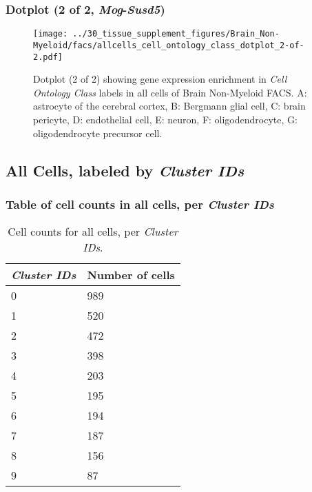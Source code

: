 \clearpage

\subsubsection{Dotplot (2 of 2, \emph{Mog}-\emph{Susd5})}
\begin{figure}[h]
\centering
\texttt{[image: ../30\_tissue\_supplement\_figures/Brain\_Non-Myeloid/facs/allcells\_cell\_ontology\_class\_dotplot\_2-of-2.pdf]}

\caption{ Dotplot (2 of 2)  showing gene expression enrichment in \emph{Cell Ontology Class} labels in all cells of Brain Non-Myeloid FACS. A: astrocyte of the cerebral cortex, B: Bergmann glial cell, C: brain pericyte, D: endothelial cell, E: neuron, F: oligodendrocyte, G: oligodendrocyte precursor cell.}
\end{figure}


\clearpage

\subsection{All Cells, labeled by \emph{Cluster IDs}}
\subsubsection{Table of cell counts in all cells, per \emph{Cluster IDs}}\begin{table}[h]
\centering
\label{my-label}
\begin{tabular}{@{}ll@{}}
\toprule

\emph{Cluster IDs}& Number of cells \\ \midrule
0 & 989 \\

1 & 520 \\

2 & 472 \\

3 & 398 \\

4 & 203 \\

5 & 195 \\

6 & 194 \\

7 & 187 \\

8 & 156 \\

9 & 87 \\
\bottomrule
\end{tabular}
\caption{Cell counts for all cells, per \emph{Cluster IDs}.}
\end{table}

